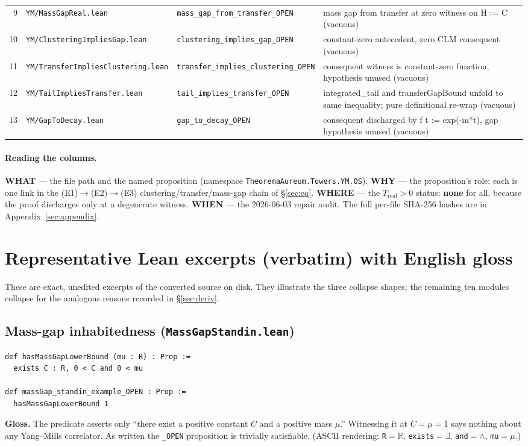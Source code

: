 \documentclass[11pt]{article}
\begin{document}
{\begin{longtable}{@{}r p{3.0cm} p{4.5cm} p{4.6cm}@{}}
9 & \texttt{YM/MassGapReal.lean} & \texttt{mass\_gap\_from\_transfer\_OPEN} & mass gap from transfer at zero witness on H := C (vacuous) \\
10 & \texttt{YM/ClusteringImpliesGap.lean} & \texttt{clustering\_implies\_gap\_OPEN} & constant-zero antecedent, zero CLM consequent (vacuous) \\
11 & \texttt{YM/TransferImpliesClustering.lean} & \texttt{transfer\_implies\_clustering\_OPEN} & consequent witness is constant-zero function, hypothesis unused (vacuous) \\
12 & \texttt{YM/TailImpliesTransfer.lean} & \texttt{tail\_implies\_transfer\_OPEN} & integrated\_tail and transferGapBound unfold to same inequality; pure definitional re-wrap (vacuous) \\
13 & \texttt{YM/GapToDecay.lean} & \texttt{gap\_to\_decay\_OPEN} & consequent discharged by f t := exp(-m*t), gap hypothesis unused (vacuous) \\
\bottomrule
\end{longtable}}

\paragraph{Reading the columns.}
\textbf{WHAT} --- the file path and the named proposition (namespace
\texttt{TheoremaAureum.Towers.YM.OS}). \textbf{WHY} --- the proposition's role:
each is one link in the (E1)$\to$(E2)$\to$(E3) clustering/transfer/mass-gap
chain of \S\ref{sec:eq}. \textbf{WHERE} --- the $T_{\mathrm{real}}>0$ status:
\textbf{none} for all, because the proof discharges only at a degenerate
witness. \textbf{WHEN} --- the 2026-06-03 repair audit. The full per-file
SHA-256 hashes are in Appendix~\ref{sec:appendix}.
\clearpage
\section{Representative Lean excerpts (verbatim) with English gloss}
\label{sec:excerpts}

These are exact, unedited excerpts of the converted source on disk. They
illustrate the three collapse shapes; the remaining ten modules collapse for
the analogous reasons recorded in \S\ref{sec:deriv}.

\subsection{Mass-gap inhabitedness (\texttt{MassGapStandin.lean})}
\begin{Verbatim}[fontsize=\small,frame=single]
def hasMassGapLowerBound (mu : R) : Prop :=
  exists C : R, 0 < C and 0 < mu

def massGap_standin_example_OPEN : Prop :=
  hasMassGapLowerBound 1
\end{Verbatim}
\textbf{Gloss.} The predicate asserts only ``there exist a positive constant
$C$ and a positive mass $\mu$.'' Witnessing it at $C=\mu=1$ says nothing about
any Yang--Mills correlator. As written the \texttt{\_OPEN} proposition is
trivially satisfiable. (ASCII rendering: \texttt{R}$=\mathbb R$,
\texttt{exists}$=\exists$, \texttt{and}$=\wedge$, \texttt{mu}$=\mu$.)
\end{document}
